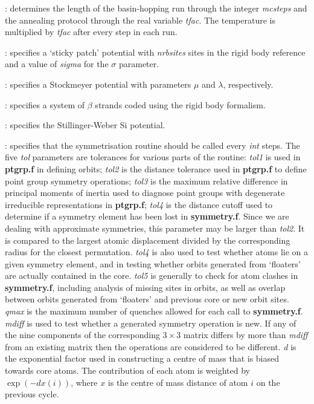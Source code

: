 {: determines the length of the
basin-hopping run through the integer {\it mcsteps\/} and the annealing protocol through
the real variable {\it tfac\/}. The temperature is multiplied by {\it tfac\/}
after every step in each run. 

: specifies a `sticky patch' potential with {\it nrbsites}
sites in the rigid body reference and a value of {\it sigma} for the $\sigma$ parameter.

: specifies a Stockmeyer potential with parameters
$\mu$ and $\lambda$, respectively.

: specifies a system of $\beta$ strands coded using the rigid body formalism.

: specifies the Stillinger-Weber Si potential.

: specifies that the symmetrisation
routine should be called every {\it int} steps. The five {\it tol} parameters are tolerances
for various parts of the routine: 
{\it tol1} is used in {\bf ptgrp.f} in defining orbits; 
{\it tol2} is the distance tolerance used in {\bf ptgrp.f} to define point group symmetry operations;
{\it tol3} is the maximum relative difference in principal moments of inertia used to
diagnose point groups with degenerate irreducible representations in {\bf ptgrp.f};
{\it tol4} is the distance cutoff used to determine if a symmetry element has been lost in {\bf symmetry.f}.
Since we are dealing with approximate symmetries, this parameter may be larger than {\it tol2}.
It is compared to the largest atomic displacement divided by the corresponding radius
for the closest permutation.
{\it tol4} is also used to test whether atoms lie on a given symmetry element, and in testing 
whether orbits generated from `floaters' are actually contained in the core.
{\it tol5} is generally to check for atom clashes in {\bf symmetry.f}, including analysis of
missing sites in orbits, as well as overlap between orbits generated from `floaters' and
previous core or new orbit sites.
{\it qmax} is the maximum number of quenches allowed for each call to {\bf symmetry.f}.
{\it mdiff} is used to test whether a generated symmetry operation is new. If any of the nine
components of the corresponding $3\times3$ matrix differs by more than {\it mdiff} from an
existing matrix then the operations are considered to be different.
{\it d} is the exponential factor used in constructing a centre of mass that is biased towards
core atoms. The contribution of each atom is weighted by $\exp(-dx(i))$, where $x$ is the 
centre of mass distance of atom $i$ on the previous cycle.

}
